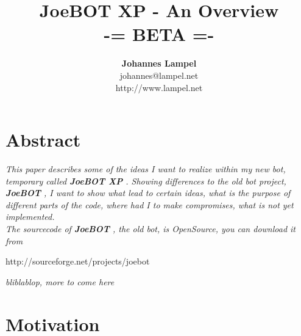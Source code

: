 \documentclass[12pt]{article}
\newcommand {\joebotxp}{\textit{\textbf{JoeBOT XP}} }
\newcommand {\joebot}{\textit{\textbf{JoeBOT}} }
\begin{document}
\title{\textbf{JoeBOT XP - An Overview\\-= BETA =-}}
\author{\textbf{Johannes Lampel}\\ johannes@lampel.net\\ http://www.lampel.net}

\maketitle

\date {}

\section{Abstract}
\textit{This paper describes some of the ideas I want to realize within my new bot, temporary called \joebotxp. Showing differences to the old bot project, \joebot, I want to show what lead to certain ideas, what is the purpose of different parts of the code, where had I to make compromises, what is not yet implemented. \\
The sourcecode of \joebot, the old bot, is OpenSource, you can download it from}
\begin{center}
\mbox{http://sourceforge.net/projects/joebot}
\end{center}
\textit{
bliblablop, more to come here
}

\newpage

\tableofcontents

\newpage

\section{Motivation}
\end{document}
